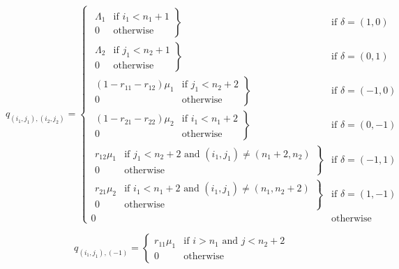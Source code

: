 \documentclass{article}
\numberwithin{equation}{section}
\begin{document}
\begin{equation}\label{eqn:2nssfA}
  q_{(i_1, j_1),(i_2, j_2)} = \left\{
  \begin{array}{rr}
    \left. \begin{array}{rr}
      \Lambda_1 & \text{if } i_1 < n_1 + 1 \\
      0 & \text{otherwise}
    \end{array} \right\} & \text{if } \delta = (1, 0) \\
    \left. \begin{array}{rr}
      \Lambda_2 & \text{if } j_1 < n_2 + 1 \\
      0 & \text{otherwise}
    \end{array} \right\} & \text{if } \delta = (0, 1) \\
    \left. \begin{array}{rr}
      (1 - r_{11} - r_{12})\mu_1 & \text{if } j_1 < n_2 + 2 \\
      0 & \text{otherwise}
    \end{array} \right\} & \text{if } \delta = (-1, 0) \\
    \left. \begin{array}{rr}
      (1 - r_{21} - r_{22})\mu_2 & \text{if } i_1 < n_1 + 2 \\
      0 & \text{otherwise}
    \end{array} \right\} & \text{if } \delta = (0, -1) \\
    \left. \begin{array}{rr}
      r_{12}\mu_1 & \text{if } j_1 < n_2 + 2 \text{ and } (i_1, j_1) \neq (n_1 + 2, n_2) \\
      0 & \text{otherwise}
    \end{array} \right\} & \text{if } \delta = (-1, 1) \\
    \left. \begin{array}{rr}
      r_{21}\mu_2 & \text{if } i_1 < n_1 + 2 \text{ and } (i_1, j_1) \neq (n_1, n_2 + 2) \\
      0 & \text{otherwise}
    \end{array} \right\} & \text{if } \delta = (1, -1) \\
    0 & \text{otherwise}
  \end{array} \right.
\end{equation}

\begin{equation}\label{equ:todeadlock2}
  q_{(i_1, j_1), (-1)} = \left\{
  \begin{array}{rr}
    r_{11}\mu_1 & \text{if } i > n_1 \text{ and } j < n_2 + 2 \\
    0 & \text{otherwise}
  \end{array}
  \right.
\end{equation}
\end{document}
